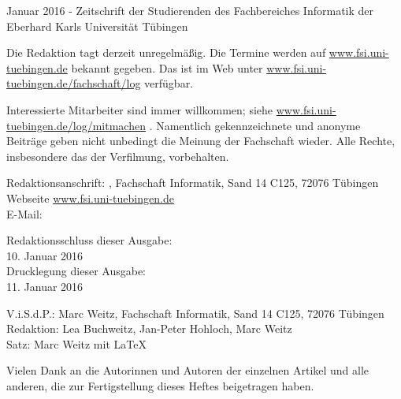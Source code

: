 \nameit \space \space Januar 2016 - Zeitschrift der Studierenden des Fachbereiches Informatik der Eberhard Karls Universität Tübingen

Die Redaktion tagt derzeit unregelmäßig. Die Termine werden auf \url{www.fsi.uni-tuebingen.de} bekannt  gegeben.  Das  \nameit \space ist  im  Web  unter \url{www.fsi.uni-tuebingen.de/fachschaft/log} verfügbar.

Interessierte Mitarbeiter sind immer willkommen; 
siehe \url{www.fsi.uni-tuebingen.de/log/mitmachen}
.
Namentlich gekennzeichnete und anonyme Beiträge geben nicht unbedingt die Meinung der Fachschaft wieder. Alle Rechte, insbesondere das der Verfilmung, vorbehalten.

Redaktionsanschrift:
\nameit, Fachschaft Informatik, Sand 14 C125, 72076 Tübingen\\
Webseite \url{www.fsi.uni-tuebingen.de}\\
E-Mail:

Redaktionsschluss dieser Ausgabe:\\
10. Januar 2016\\
Drucklegung dieser Ausgabe:\\
11. Januar 2016

V.i.S.d.P.: Marc Weitz, Fachschaft Informatik, Sand 14 C125, 72076 Tübingen\\
Redaktion: Lea Buchweitz, Jan-Peter Hohloch, Marc Weitz\\
Satz: Marc Weitz mit \LaTeX 

Vielen Dank an die Autorinnen und Autoren der einzelnen Artikel und alle anderen, die zur Fertigstellung dieses Heftes beigetragen haben.

